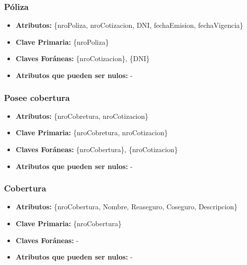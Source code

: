 \documentclass[a4paper,11pt]{article}
\begin{document}
\subsubsection{Póliza}

\begin{itemize}

	\item \textbf{Atributos:} \{nroPoliza, nroCotizacion, DNI, fechaEmision, fechaVigencia\}

	\item \textbf{Clave Primaria:} \{nroPoliza\}

	\item \textbf{Claves Foráneas:} \{nroCotizacion\}, \{DNI\}

	\item \textbf{Atributos que pueden ser nulos:} -
	
\end{itemize}

\subsubsection{Posee cobertura}

\begin{itemize}

	\item \textbf{Atributos:} \{nroCobretura, nroCotizacion\}

	\item \textbf{Clave Primaria:} \{nroCobretura, nroCotizacion\}
	
	\item \textbf{Claves Foráneas:} \{nroCobertura\}, \{nroCotizacion\}

	\item \textbf{Atributos que pueden ser nulos:} -
	
\end{itemize}

\subsubsection{Cobertura}

\begin{itemize}

	\item \textbf{Atributos:} \{nroCobertura, Nombre, Reaseguro, Coseguro, Descripcion\}

	\item \textbf{Clave Primaria:} \{nroCobertura\}
	
	\item \textbf{Claves Foráneas:} -

	\item \textbf{Atributos que pueden ser nulos:} -
	
\end{itemize}
\end{document}
